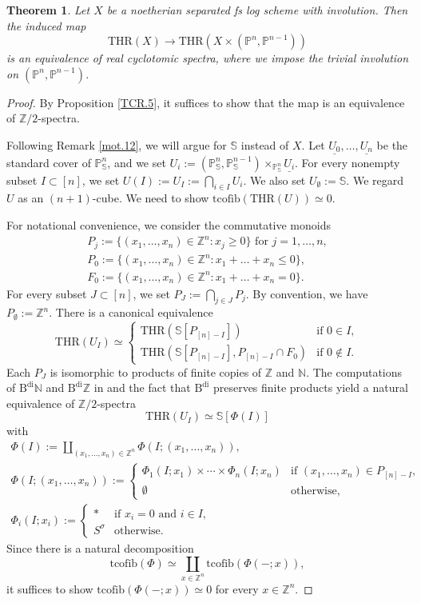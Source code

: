 \documentclass[10pt]{amsart}
\newtheorem{thm}{Theorem}[section]
\theoremstyle{definition}
\theoremstyle{remark}
\numberwithin{equation}{section}
\newcommand{\N}{\mathbb{N}}
\renewcommand{\P}{\mathbb{P}}
\newcommand{\Sphere}{\mathbb{S}}
\newcommand{\Z}{\mathbb{Z}}
\newcommand{\ul}{\underline}
\newcommand{\tcofib}{\mathrm{tcofib}}
\newcommand{\Bdi}{\mathrm{B}^{\mathrm{di}}}
\newcommand{\THR}{\mathrm{THR}}
\newcommand{\Ztwo}{{\mathbb{Z}/2}}
\begin{document}
\begin{thm}
\label{mot.1}
Let $X$ be a noetherian separated fs log scheme with involution.
Then the induced map
\[
\THR(X)
\to
\THR(X\times (\P^n,\P^{n-1}))
\]
is an equivalence of real cyclotomic spectra,
where we impose the trivial involution on $(\P^n,\P^{n-1})$.
\end{thm}
\begin{proof}
By Proposition \ref{TCR.5},
it suffices to show that the map is an equivalence of $\Z/2$-spectra.

Following Remark \ref{mot.12},
we will argue for $\Sphere$ instead of $X$.
Let $\ul{U_0},\ldots,\ul{U_n}$ be the standard cover of $\P_{\Sphere}^n$,
and we set $U_i:=(\P_{\Sphere}^n,\P_{\Sphere}^{n-1})\times_{\P_{\Sphere}^n} \ul{U_i}$.
For every nonempty subset $I\subset [n]$,
we set $U(I):=U_I:=\bigcap_{i\in I} U_i$.
We also set $U_\emptyset:=\Sphere$.
We regard $U$ as an $(n+1)$-cube.
We need to show $\tcofib(\THR(U))\simeq 0$.

For notational convenience,
we consider the commutative monoids
\begin{gather*}
P_j:=\{(x_1,\ldots,x_n)\in \Z^n : x_j\geq 0\}
\text{ for $j=1,\ldots,n$},
\\
P_0:=\{(x_1,\ldots,x_n)\in \Z^n : x_1+\ldots+x_n \leq 0\},
\\
F_0:=\{(x_1,\ldots,x_n)\in \Z^n : x_1+\ldots+x_n = 0\}.
\end{gather*}
For every subset $J\subset [n]$,
we set $P_J:=\bigcap_{j\in J}P_j$.
By convention,
we have 
$P_\emptyset:=\Z^n$.
There is a canonical equivalence
\[
\THR(U_I)
\simeq
\left\{
\begin{array}{ll}
\THR(\Sphere[P_{[n]-I}])& \text{if $0\in I$},
\\
\THR(\Sphere[P_{[n]-I}],P_{[n]-I}\cap F_0)
&\text{if $0\notin I$}.
\end{array}
\right.
\]
Each $P_J$ is isomorphic to products of finite copies of $\Z$ and $\N$.
The computations of $\Bdi \N$ and $\Bdi \Z$ in \cite[(4.12), Propositions 4.2.11, 4.2.12]{THR} and the fact that $\Bdi$ preserves finite products \cite[Proposition 4.2.4]{THR} yield a natural equivalence of $\Ztwo$-spectra
\[
\THR(U_I)
\simeq
\Sphere[\Phi(I)]
\]
with
\begin{gather*}
\Phi(I)
:=
\coprod_{(x_1,\ldots,x_n)\in \Z^n} \Phi(I;(x_1,\ldots,x_n)),
\\
\Phi(I;(x_1,\ldots,x_n))
:=
\left\{
\begin{array}{ll}
\Phi_1(I;x_1) \times \cdots \times \Phi_n(I;x_n)
&
\text{if $(x_1,\ldots,x_n)\in P_{[n]-I}$},
\\
\emptyset
&
\text{otherwise},
\end{array}
\right.
\\
\Phi_i(I;x_i)
:=
\left\{
\begin{array}{ll}
* & \text{if $x_i=0$ and $i\in I$},
\\
S^\sigma & \text{otherwise}.
\end{array}
\right.
\end{gather*}
Since there is a natural decomposition
\[
\tcofib(\Phi)
\simeq
\coprod_{x\in \Z^n}\tcofib(\Phi(-;x)),
\]
it suffices to show $\tcofib(\Phi(-;x))\simeq 0$ for every $x\in \Z^n$.


\end{proof}
\end{document}
